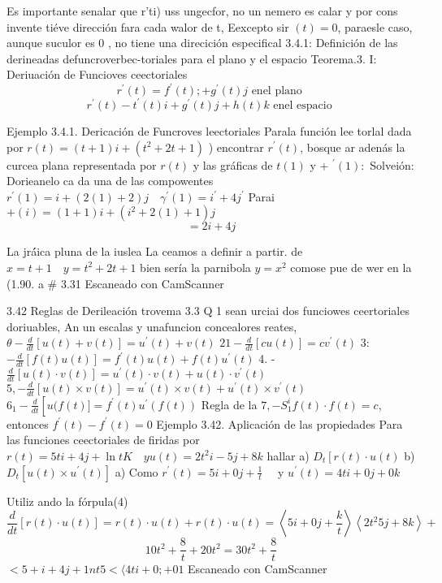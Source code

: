 

Es importante senalar que r'ti) uss ungecfor, no un nemero es calar y por cons invente tiéve dirección fara cada walor de t, Eexcepto sir $(t)=0$, paraesle caso, aunque suculor es 0 , no tiene una direcición especifical
3.4.1: Definición de las derineadas defuncroverbec-toriales para el plano y el espacio
Teorema.3. I: Deriuación de Funcioves ceectoriales
$$
r^{\prime}(t)=f^{\prime}(t) ;+g^{\prime}(t) j \text { enel plano }
$$
$$
r^{\prime}(t)-t^{\prime}(t) i+g^{\prime}(t) j+h(t) k \text { enel espacio }
$$

Ejemplo 3.4.1. Dericación de Funcroves leectoriales Parala función lee torlal dada por $r(t)=(t+1) i+\left(t^2+2 t+1\right)$ ) encontrar $r^{\prime}(t)$, bosque ar adenás la curcea plana representada por $r(t)$ y las gráficas de $t(1)$ y + $^{\prime}(1):$
Solveión: Dorieanelo ca da una de las compowentes $r^{\prime}(1)=i+(2(1)+2) j \quad \gamma^{\prime}(1)=i^{\prime}+4 j^{\prime}$
Parai $+(i)=(1+1) i+\left(i^2+2(1)+1\right) j$
$$
=2 i+4 j
$$

La jrá́ica pluna de la iuslea La ceamos a definir a partir. de $x=t+1 \quad y=t^2+2 t+1$
bien sería la parnibola $y=x^2$ comose pue de wer en la (1.90. a \# 3.31
Escaneado con CamScanner




3.42 Reglas de Derileación trovema 3.3 Q 1
sean urciai dos funciowes ceertoriales doriuables, An un escalas y unafuncion concealores reates,
$\theta-\frac{d}{d t}[u(t)+v(t)]=u^{\prime}(t)+v(t)$
$21-\frac{d}{d t}[c u(t)]=c v^{\prime}(t)$
3: $-\frac{d}{d t}[f(t) u(t)]=f^{\prime}(t) u(t)+f(t) u^{\prime}(t)$
4. - $\frac{d}{d t}[u(t) \cdot v(t)]=u^{\prime}(t) \cdot v(t)+u(t) \cdot v^{\prime}(t)$
$5,-\frac{d}{d t}[u(t) \times v(t)]=u^{\prime}(t) \times v(t)+u^{\prime}(t) \times v^{\prime}(t)$
$6_1-\frac{d}{d t}\left[u(f(t)]=f^{\prime}(t) u^{\prime}(f(t))\right.$ Regla de la
$7,-S_1^i f(t) \cdot f(t)=c$, entonces $f^{\prime}(t)-f^{\prime}(t)=0$
Ejemplo 3.42. Aplicación de las propiedades Para las funciones ceectoriales de firidas por $r(t)=5 t i+4 j+\ln t K \quad y u(t)=2 t^2 i-5 j+8 k$
hallar a) $D_t\left[r(t) \cdot u(t)\right.$ b) $D_t\left[u(t) \times u^{\prime}(t)\right]$
a) Como $r^{\prime}(t)=5 i+0 j+\frac{1}{t} \quad$ y $u^{\prime}(t)=4 t i+0 j+0 k$

Utiliz ando la fórpula(4)
$$
\frac{d}{d t}[r(t) \cdot u(t)]=r(t) \cdot u(t)+r(t) \cdot u(t)=\left\langle 5 i+0 j+\frac{k}{t}\right\rangle\left\langle 2 t{ }^2 5 j+8 k\right\rangle+
$$
$$
10 t^2+\frac{8}{t}+20 t^2=30 t^2+\frac{8}{t}
$$
$<5+i+4 j+1 n t 5<\langle 4 t i+0 ;+01$
Escaneado con CamScanner


